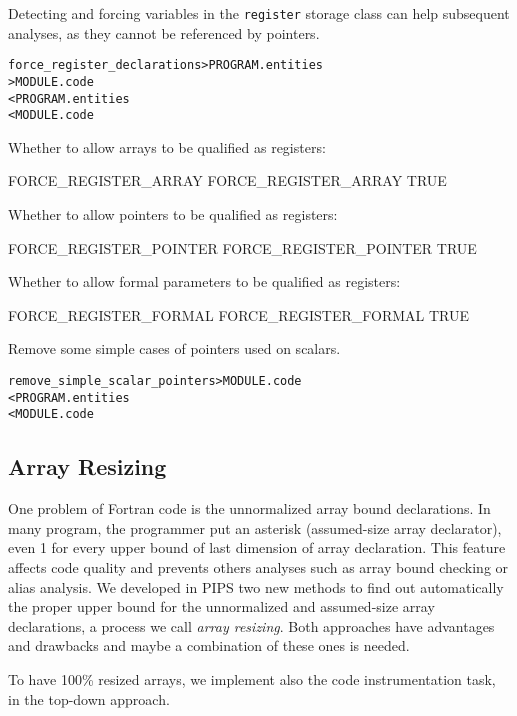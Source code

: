 \documentclass[a4paper]{report}
\newenvironment{PipsMake}{\begin{alltt}}{\end{alltt}}
\newenvironment{PipsPass}[1]{\label{pass:#1}}{}
\begin{document}
Detecting and forcing variables in the \texttt{register} storage class can
help subsequent analyses, as they cannot be referenced by pointers.
\begin{PipsMake}
force_register_declarations > PROGRAM.entities
                            > MODULE.code
         < PROGRAM.entities
         < MODULE.code
\end{PipsMake}

Whether to allow arrays to be qualified as registers:
\begin{PipsProp}{FORCE_REGISTER_ARRAY}
FORCE_REGISTER_ARRAY TRUE
\end{PipsProp}

Whether to allow pointers to be qualified as registers:
\begin{PipsProp}{FORCE_REGISTER_POINTER}
FORCE_REGISTER_POINTER TRUE
\end{PipsProp}

Whether to allow formal parameters to be qualified as registers:
\begin{PipsProp}{FORCE_REGISTER_FORMAL}
FORCE_REGISTER_FORMAL TRUE
\end{PipsProp}


\begin{PipsPass}{remove_simple_scalar_pointers}
Remove some simple cases of pointers used on scalars.
\end{PipsPass}
\begin{PipsMake}
remove_simple_scalar_pointers > MODULE.code
         < PROGRAM.entities
         < MODULE.code
\end{PipsMake}


\subsection{Array Resizing}
\label{subsubsection-array-resizing}

One problem of Fortran code is the unnormalized array bound
declarations. In many program, the programmer put an asterisk
(assumed-size array declarator), even 1 for every
upper bound of last dimension of array declaration. This feature affects
code quality and prevents others analyses such as array bound checking or
alias analysis. We developed in PIPS two new methods to find out
automatically the proper upper bound for the unnormalized and assumed-size
array declarations, a process we call {\em array resizing}. Both
approaches have advantages and drawbacks and maybe a combination of these
ones is needed.

To have 100\% resized arrays, we implement also the code instrumentation
task, in the top-down approach.
\end{document}
